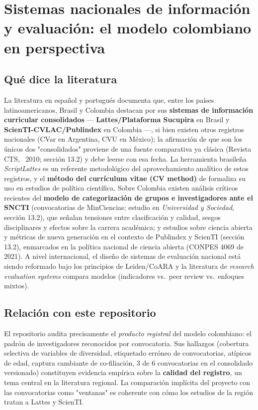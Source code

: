 \section{Sistemas nacionales de información y evaluación: el modelo colombiano en perspectiva}

\subsection{Qué dice la literatura}

La literatura en español y portugués documenta que, entre los países
latinoamericanos, Brasil y Colombia destacan por sus \textbf{sistemas de
información curricular consolidados} — \textbf{Lattes/Plataforma Sucupira} en
Brasil y \textbf{ScienTI-CVLAC/Publindex} en Colombia —, si bien existen otros
registros nacionales (CVar en Argentina, CVU en México); la afirmación de que
son los únicos dos "consolidados" proviene de una fuente comparativa ya clásica
(Revista CTS, ~2010; sección 13.2) y debe leerse con esa fecha. La herramienta
brasileña \emph{ScriptLattes} \citep{menachalco2009scriptlattes} es un
referente metodológico del aprovechamiento analítico de estos registros, y el
\textbf{método del currículum vitae (CV method)} de \citet{canibano2009curriculum}
formaliza su uso en estudios de política científica. Sobre Colombia existen
análisis críticos recientes del \textbf{modelo de categorización de grupos e
investigadores ante el SNCTI} (convocatorias de MinCiencias; estudio en
\emph{Universidad y Sociedad}, sección 13.2), que señalan tensiones entre
clasificación y calidad, sesgos disciplinares y efectos sobre la carrera
académica; y estudios sobre ciencia abierta y métricas de nueva generación en
el contexto de Publindex y ScienTI (sección 13.2), enmarcados en la política
nacional de ciencia abierta (CONPES 4069 de 2021). A nivel internacional, el
diseño de sistemas de evaluación nacional está siendo reformado bajo los
principios de Leiden/CoARA \citep{coara2022} y la literatura de
\emph{research evaluation systems} compara modelos (indicadores vs.\ peer
review vs.\ enfoques mixtos).

\subsection{Relación con este repositorio}

El repositorio audita precisamente el \emph{producto registral} del modelo
colombiano: el padrón de investigadores reconocidos por convocatoria. Sus
hallazgos (cobertura selectiva de variables de diversidad, etiquetado erróneo
de convocatorias, atípicos de edad, captura cambiante de co-filiación, 3 de 6
convocatorias en el consolidado versionado) constituyen evidencia empírica
sobre la \textbf{calidad del registro}, un tema central en la literatura
regional. La comparación implícita del proyecto con las convocatorias como
"ventanas" es coherente con cómo los estudios de la región tratan a Lattes y
ScienTI.

